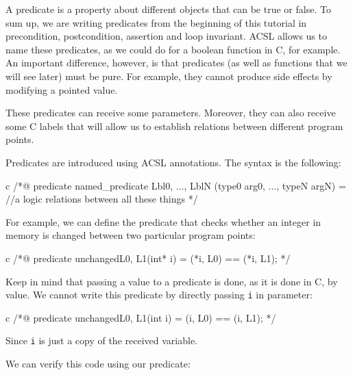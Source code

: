 A predicate is a property about different objects that can be true or
false. To sum up, we are writing predicates from the beginning of this
tutorial in precondition, postcondition, assertion and loop invariant.
ACSL allows us to name these predicates, as we could do for a boolean
function in C, for example. An important difference, however, is that
predicates (as well as functions that we will see later) must be pure.
For example, they cannot produce side effects by modifying a pointed
value.

These predicates can receive some parameters. Moreover, they can also
receive some C labels that will allow us to establish relations between
different program points.





Predicates are introduced using ACSL annotations. The syntax is the
following:



\begin{CodeBlock}{c}
/*@
  predicate named_predicate { Lbl0, ..., LblN }(type0 arg0, ..., typeN argN) =
    //a logic relations between all these things
*/
\end{CodeBlock}



For example, we can define the predicate that checks whether an integer
in memory is changed between two particular program points:



\begin{CodeBlock}{c}
/*@
  predicate unchanged{L0, L1}(int* i) =
    \at(*i, L0) == \at(*i, L1);
*/
\end{CodeBlock}



\begin{Warning}
  Keep in mind that passing a value to a predicate is done, as it is done in C,
  by value. We cannot write this predicate by directly passing \texttt{i} in
  parameter:

\begin{CodeBlock}{c}
/*@
  predicate unchanged{L0, L1}(int i) =
    \at(i, L0) == \at(i, L1);
 */
\end{CodeBlock}

  Since \texttt{i} is just a copy of the received variable.
\end{Warning}


We can verify this code using our predicate:



